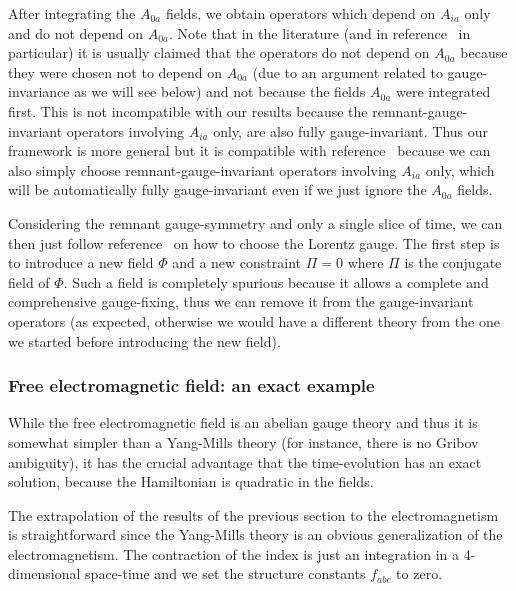 \documentclass[11pt]{book}
\begin{document}
After integrating the \(A_{0 a}\) fields, we obtain operators which
depend on \(A_{i a}\) only and do not depend on \(A_{0 a}\). Note that
in the literature (and in
reference~\cite{Henneaux1992Quantization} in particular) it is usually claimed that the
operators do not depend on \(A_{0 a}\) because they were chosen not to
depend on \(A_{0 a}\) (due to an argument related to gauge-invariance as
we will see below) and not because the fields \(A_{0 a}\) were
integrated first. This is not incompatible with our results because the
remnant-gauge-invariant operators involving \(A_{i a}\) only, are also
fully gauge-invariant. Thus our framework is more general but it is
compatible with
reference~\cite{Henneaux1992Quantization} because we can also simply choose
remnant-gauge-invariant operators involving \(A_{i a}\) only, which will
be automatically fully gauge-invariant even if we just ignore the
\(A_{0 a}\) fields.

Considering the remnant gauge-symmetry and only a single slice of time,
we can then just follow
reference~\cite{Henneaux1992Quantization} on how to choose the Lorentz gauge. The first step is
to introduce a new field \(\Phi\) and a new constraint \(\Pi=0\) where
\(\Pi\) is the conjugate field of \(\Phi\). Such a field is completely
spurious because it allows a complete and comprehensive gauge-fixing,
thus we can remove it from the gauge-invariant operators (as expected,
otherwise we would have a different theory from the one we started
before introducing the new field).

\hypertarget{free-electromagnetic-field-an-exact-example}{%
\subsubsection{Free electromagnetic field: an exact
example}\label{free-electromagnetic-field-an-exact-example}}

While the free electromagnetic field is an abelian gauge theory and thus
it is somewhat simpler than a Yang-Mills theory (for instance, there is
no Gribov ambiguity), it has the crucial advantage that the
time-evolution has an exact solution, because the Hamiltonian is
quadratic in the fields.

The extrapolation of the results of the previous section to the
electromagnetism is straightforward since the Yang-Mills theory is an
obvious generalization of the electromagnetism. The contraction of the
index is just an integration in a 4-dimensional space-time and we set
the structure constants \(f_{a b c}\) to zero.
\end{document}
